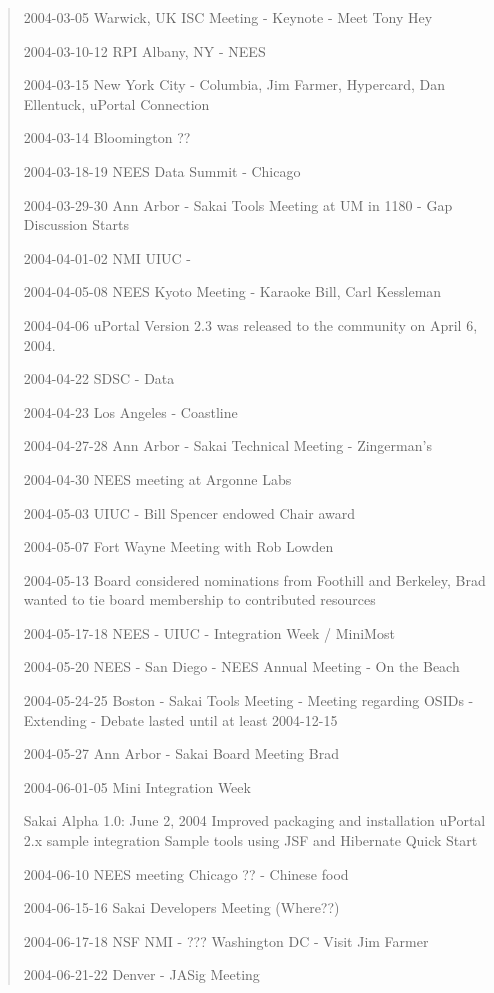 \begin{quote}
2004-03-05 Warwick, UK ISC Meeting - Keynote - Meet Tony Hey

2004-03-10-12 RPI Albany, NY - NEES

2004-03-15 New York City - Columbia, Jim Farmer, Hypercard, Dan Ellentuck, uPortal Connection

2004-03-14 Bloomington ??

2004-03-18-19 NEES Data Summit - Chicago

2004-03-29-30 Ann Arbor - Sakai Tools Meeting at UM in 1180 - Gap Discussion Starts

2004-04-01-02 NMI  UIUC - 

2004-04-05-08 NEES Kyoto Meeting - Karaoke Bill, Carl Kessleman

2004-04-06 uPortal Version 2.3 was released to the community on April 6, 2004.

2004-04-22 SDSC - Data

2004-04-23 Los Angeles -  Coastline

2004-04-27-28 Ann Arbor - Sakai Technical Meeting - Zingerman's

2004-04-30  NEES meeting at Argonne Labs

2004-05-03 UIUC - Bill Spencer endowed Chair award

2004-05-07 Fort Wayne Meeting with Rob Lowden

2004-05-13 Board considered nominations from Foothill and Berkeley, Brad wanted to tie board membership to contributed resources

2004-05-17-18 NEES - UIUC - Integration Week / MiniMost

2004-05-20 NEES - San Diego - NEES Annual Meeting - On the Beach

2004-05-24-25 Boston - Sakai Tools Meeting - Meeting regarding OSIDs - Extending - Debate lasted until at least 2004-12-15

2004-05-27 Ann Arbor - Sakai Board Meeting Brad

2004-06-01-05 Mini Integration Week

Sakai Alpha 1.0: June 2, 2004
Improved packaging and installation
uPortal 2.x sample integration
Sample tools using JSF and Hibernate
Quick Start

2004-06-10 NEES meeting Chicago ?? - Chinese food

2004-06-15-16 Sakai Developers Meeting (Where??)

2004-06-17-18 NSF NMI -  ??? Washington DC - Visit Jim Farmer

2004-06-21-22 Denver - JASig Meeting


\end{quote}

